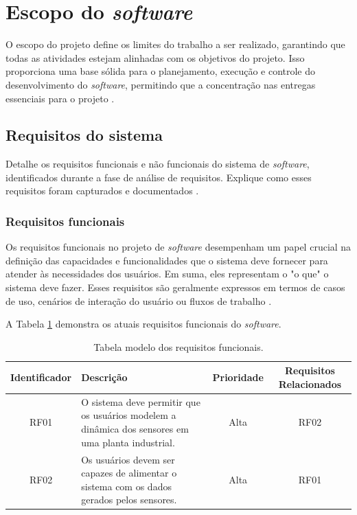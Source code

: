 \section{Escopo do \textit{software}}

O escopo do projeto define os limites do trabalho a ser realizado, garantindo que todas as atividades estejam alinhadas com os objetivos do projeto. Isso proporciona uma base sólida para o planejamento, execução e controle do desenvolvimento do \textit{software}, permitindo que a concentração nas entregas essenciais para o projeto \cite{softwareeng}.

\subsection{Requisitos do sistema}

Detalhe os requisitos funcionais e não funcionais do sistema de \textit{software}, identificados durante a fase de análise de requisitos. Explique como esses requisitos foram capturados e documentados \cite{softwareengreq}.
    
\subsubsection{Requisitos funcionais}

Os requisitos funcionais no projeto de \textit{software} desempenham um papel crucial na definição das capacidades e funcionalidades que o sistema deve fornecer para atender às necessidades dos usuários. Em suma, eles representam o "o que" o sistema deve fazer. Esses requisitos são geralmente expressos em termos de casos de uso, cenários de interação do usuário ou fluxos de trabalho \cite{softwareengreq}.
        
A Tabela \ref{tab:req_funcional} demonstra os atuais requisitos funcionais do \textit{software}.

\begin{table}[htbp]
\begin{tabularx}{\linewidth}{|c|X|c|c|} \hline
\textbf{Identificador} & 
\textbf{Descrição} & 
\textbf{Prioridade} &
\textbf{Requisitos Relacionados}\\ \hline
RF01 & 
O sistema deve permitir que os usuários modelem a dinâmica dos sensores em uma planta industrial. & 
Alta & 
RF02 \\ \hline
RF02 & 
Os usuários devem ser capazes de alimentar o sistema com os dados gerados pelos sensores. & 
Alta & 
RF01 \\ \hline
\end{tabularx}

\caption{Tabela modelo dos requisitos funcionais.}
\label{tab:req_funcional}
\end{table}
            
